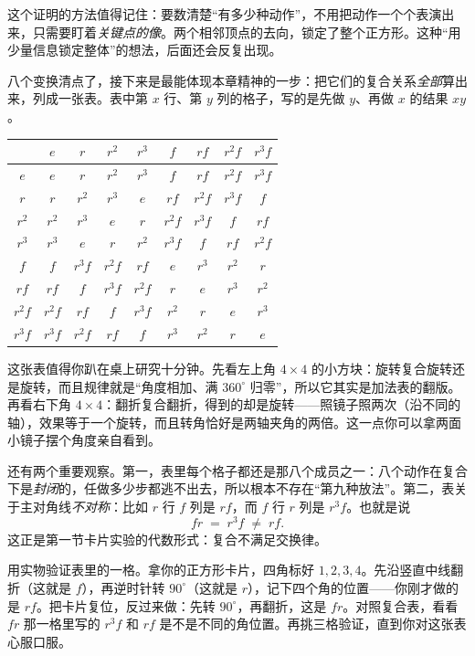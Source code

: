 这个证明的方法值得记住：要数清楚“有多少种动作”，不用把动作一个个表演出来，只需要盯着\emph{关键点的像}。两个相邻顶点的去向，锁定了整个正方形。这种“用少量信息锁定整体”的想法，后面还会反复出现。

八个变换清点了，接下来是最能体现本章精神的一步：把它们的复合关系\emph{全部}算出来，列成一张表。表中第 $x$ 行、第 $y$ 列的格子，写的是先做 $y$、再做 $x$ 的结果 $xy$。

\begin{table}[htbp]
\centering\small
\begin{tabular}{c|cccc|cccc}
\toprule
 & $e$ & $r$ & $r^2$ & $r^3$ & $f$ & $rf$ & $r^2f$ & $r^3f$\\
\midrule
$e$     & $e$ & $r$ & $r^2$ & $r^3$ & $f$ & $rf$ & $r^2f$ & $r^3f$\\
$r$     & $r$ & $r^2$ & $r^3$ & $e$ & $rf$ & $r^2f$ & $r^3f$ & $f$\\
$r^2$   & $r^2$ & $r^3$ & $e$ & $r$ & $r^2f$ & $r^3f$ & $f$ & $rf$\\
$r^3$   & $r^3$ & $e$ & $r$ & $r^2$ & $r^3f$ & $f$ & $rf$ & $r^2f$\\
\midrule
$f$     & $f$ & $r^3f$ & $r^2f$ & $rf$ & $e$ & $r^3$ & $r^2$ & $r$\\
$rf$    & $rf$ & $f$ & $r^3f$ & $r^2f$ & $r$ & $e$ & $r^3$ & $r^2$\\
$r^2f$  & $r^2f$ & $rf$ & $f$ & $r^3f$ & $r^2$ & $r$ & $e$ & $r^3$\\
$r^3f$  & $r^3f$ & $r^2f$ & $rf$ & $f$ & $r^3$ & $r^2$ & $r$ & $e$\\
\bottomrule
\end{tabular}
\end{table}

这张表值得你趴在桌上研究十分钟。先看左上角 $4\times4$ 的小方块：旋转复合旋转还是旋转，而且规律就是“角度相加、满 $360^\circ$ 归零”，所以它其实是加法表的翻版。再看右下角 $4\times4$：翻折复合翻折，得到的却是旋转——照镜子照两次（沿不同的轴），效果等于一个旋转，而且转角恰好是两轴夹角的两倍。这一点你可以拿两面小镜子摆个角度亲自看到。

还有两个重要观察。第一，表里每个格子都还是那八个成员之一：八个动作在复合下是\emph{封闭}的，任做多少步都逃不出去，所以根本不存在“第九种放法”。第二，表关于主对角线\emph{不对称}：比如 $r$ 行 $f$ 列是 $rf$，而 $f$ 行 $r$ 列是 $r^3f$。也就是说
\[
fr \;=\; r^3 f \;\neq\; rf.
\]
这正是第一节卡片实验的代数形式：复合不满足交换律。

\begin{shiyan}
用实物验证表里的一格。拿你的正方形卡片，四角标好 $1,2,3,4$。先沿竖直中线翻折（这就是 $f$），再逆时针转 $90^\circ$（这就是 $r$），记下四个角的位置——你刚才做的是 $rf$。把卡片复位，反过来做：先转 $90^\circ$，再翻折，这是 $fr$。对照复合表，看看 $fr$ 那一格里写的 $r^3f$ 和 $rf$ 是不是不同的角位置。再挑三格验证，直到你对这张表心服口服。
\end{shiyan}

